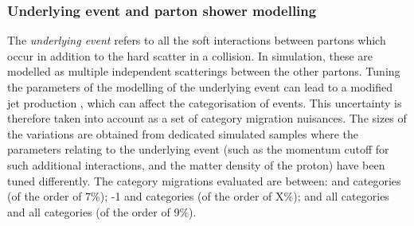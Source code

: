 \subsubsection{Underlying event and parton shower modelling}
\ifNewAnalysis
The \emph{underlying event} refers to all the soft interactions between partons which occur in addition to the hard scatter in a \pp collision. In simulation, these are modelled as multiple independent scatterings between the other partons. Tuning the parameters of the modelling of the underlying event can lead to a modified jet production \crosssection, which can affect the categorisation of \VBF events. This uncertainty is therefore taken into account as a set of category migration nuisances. The sizes of the variations are obtained from dedicated simulated samples where the parameters relating to the underlying event (such as the momentum cutoff for such additional interactions, and the matter density of the proton) have been tuned differently. The category migrations evaluated are between:  and   categories (of the order of 7\%); -1  and  categories (of the order of X\%); and all \VBFTag categories and all \Untagged categories (of the order of 9\%).

